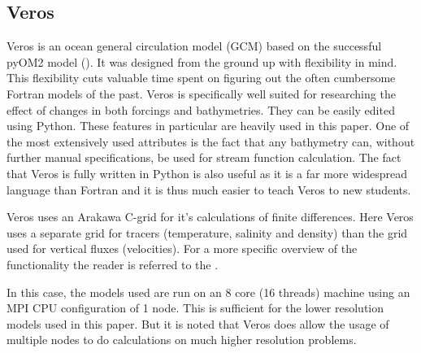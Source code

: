 \subsection{Veros}
Veros is an ocean general circulation model (GCM) based on the successful pyOM2 model (\cite{Hafner2018Aug}). It was designed from the ground up with flexibility in mind. This flexibility cuts valuable time spent on figuring out the often cumbersome Fortran models of the past. Veros is specifically well suited for researching the effect of changes in both forcings and bathymetries. They can be easily edited using Python. These features in particular are heavily used in this paper. One of the most extensively used attributes is the fact that any bathymetry can, without further manual specifications, be used for stream function calculation.
The fact that Veros is fully written in Python is also useful as it is a far more widespread language than Fortran and it is thus much easier to teach Veros to new students. 

Veros uses an Arakawa C-grid for it's calculations of finite differences. Here Veros uses a separate grid for tracers (temperature, salinity and density) than the grid used for vertical fluxes (velocities). For a more specific overview of the functionality the reader is referred to the \cite{BibEntry2020Jun}.

In this case, the models used are run on an 8 core (16 threads) machine using an MPI CPU configuration of 1 node. This is sufficient for the lower resolution models used in this paper. But it is noted that Veros does allow the usage of multiple nodes to do calculations on much higher resolution problems.

